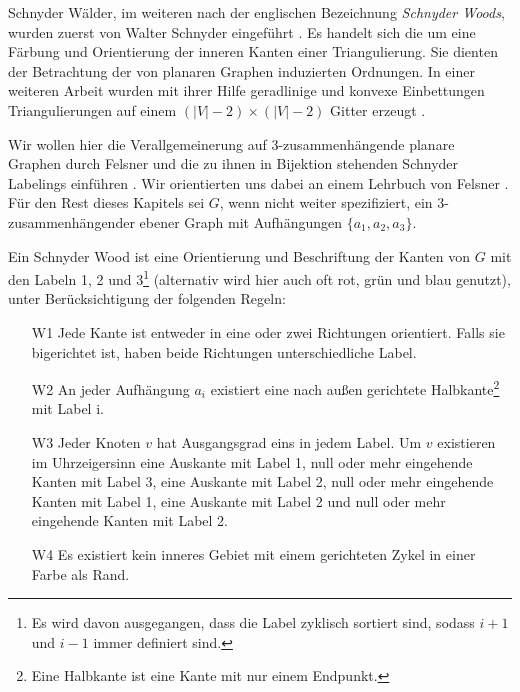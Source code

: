 Schnyder Wälder, im weiteren nach der englischen Bezeichnung \textit{Schnyder Woods}, wurden zuerst von Walter Schnyder eingeführt \cite{schnyder89}. Es handelt sich die um eine Färbung und Orientierung der inneren Kanten einer Triangulierung. Sie dienten der Betrachtung der von planaren Graphen induzierten Ordnungen. In einer weiteren Arbeit wurden mit ihrer Hilfe geradlinige und konvexe Einbettungen Triangulierungen auf einem $(|V|-2)\times(|V|-2)$ Gitter erzeugt \cite{schnyder90}.

Wir wollen hier die Verallgemeinerung auf 3-zusammenhängende planare Graphen durch Felsner und die zu ihnen in Bijektion stehenden Schnyder Labelings einführen \cite{felsner01}. Wir orientierten uns dabei an einem Lehrbuch von Felsner \cite{felsner04}. Für den Rest dieses Kapitels sei $G$, wenn nicht weiter spezifiziert, ein 3-zusammenhängender ebener Graph mit Aufhängungen $\{a_1,a_2,a_3\}$.

\begin{definition}\label{def_sw}
Ein Schnyder Wood ist eine Orientierung und Beschriftung der Kanten von $G$ mit den Labeln 1, 2 und 3\footnote{Es wird davon ausgegangen, dass die Label zyklisch sortiert sind, sodass $i+1$ und $i-1$ immer definiert sind.} (alternativ wird hier auch oft rot, grün und blau genutzt), unter Berücksichtigung der folgenden Regeln:
\begin{itemize}
\item[W1] Jede Kante ist entweder in eine oder zwei Richtungen orientiert. Falls sie bigerichtet ist, haben beide Richtungen unterschiedliche Label.
\item[W2] An jeder Aufhängung  $a_i$ existiert eine nach außen gerichtete Halbkante\footnote{Eine Halbkante ist eine Kante mit nur einem Endpunkt.} mit Label i. 
\item[W3] Jeder Knoten $v$ hat Ausgangsgrad eins in jedem Label. Um $v$ existieren im Uhrzeigersinn eine Auskante mit Label 1, null oder mehr eingehende Kanten mit Label 3, eine Auskante mit Label 2, null oder mehr  eingehende Kanten mit Label 1, eine Auskante mit Label 2 und null oder mehr  eingehende Kanten mit Label 2.
\item[W4] Es existiert kein inneres Gebiet mit einem gerichteten Zykel in einer Farbe als Rand.
\end{itemize}
\end{definition}


